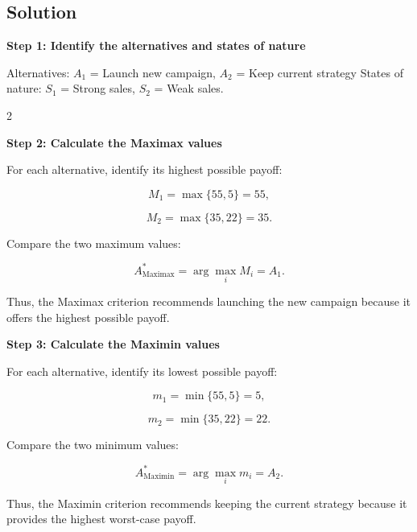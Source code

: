 	
	\subsection{Solution}
	
	\textbf{Step 1: Identify the alternatives and states of nature}
	
	Alternatives: $A_1$ = Launch new campaign, $A_2$ = Keep current strategy
	\qquad
	States of nature: $S_1$ = Strong sales, $S_2$ = Weak sales.
	
	\noindent
	\setlength{\columnseprule}{0.4pt}
	
	\begin{multicols}{2}
		\vspace{0pt}
		
		\textbf{Step 2: Calculate the Maximax values}
		
		For each alternative, identify its highest possible payoff:
		
		\[
		M_1
		=
		\max\{55,5\}
		=
		55,
		\]
		
		\[
		M_2
		=
		\max\{35,22\}
		=
		35.
		\]
		
		Compare the two maximum values:
		
		\[
		A^*_{\mathrm{Maximax}}
		=
		\arg\max_i M_i
		=
		A_1.
		\]
		
		Thus, the Maximax criterion recommends launching the new campaign because it offers the highest possible payoff.
		
		\columnbreak
		
		\textbf{Step 3: Calculate the Maximin values}
		
		For each alternative, identify its lowest possible payoff:
		
		\[
		m_1
		=
		\min\{55,5\}
		=
		5,
		\]
		
		\[
		m_2
		=
		\min\{35,22\}
		=
		22.
		\]
		
		Compare the two minimum values:
		
		\[
		A^*_{\mathrm{Maximin}}
		=
		\arg\max_i m_i
		=
		A_2.
		\]
		
		Thus, the Maximin criterion recommends keeping the current strategy because it provides the highest worst-case payoff.
		
	\end{multicols}
	
	\setlength{\columnseprule}{0pt}
	
